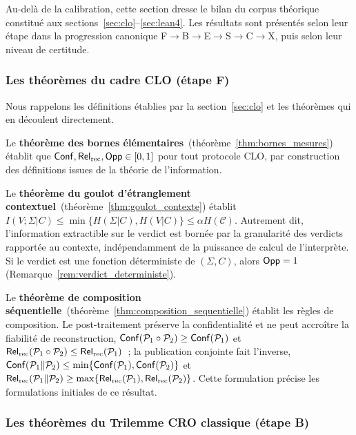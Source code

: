 \begin{sloppypar}
Au-del\`a de la calibration, cette section dresse le bilan du
corpus th\'eorique constitu\'e aux sections~\ref{sec:clo}--\ref{sec:lean4}.
Les r\'esultats sont pr\'esent\'es selon leur \'etape dans la progression
canonique F$\to$B$\to$E$\to$S$\to$C$\to$X,
puis selon leur niveau de certitude.

\subsubsection{Les th\'eor\`emes du cadre CLO (\'etape F)}
\label{subsubsec:resultats_etape_F}

Nous rappelons les d\'efinitions \'etablies par la
section~\ref{sec:clo} et les th\'eor\`emes qui en d\'ecoulent directement.

Le \textbf{th\'eor\`eme des bornes \'el\'ementaires}~(th\'eor\`eme~\ref{thm:bornes_mesures})
\'etablit que $\mathsf{Conf}, \mathsf{Rel}_{\mathrm{rec}}, \mathsf{Opp} \in [0,1]$ pour tout protocole CLO, par
construction des d\'efinitions issues de la th\'eorie de l'information.

Le \textbf{th\'eor\`eme du goulot d'\'etranglement contextuel}~(th\'eor\`eme~\ref{thm:goulot_contexte})
\'etablit $I(V;\Sigma|C) \leq \min\{H(\Sigma|C),H(V|C)\} \leq \alpha H(\mathcal{C})$. Autrement dit,
l'information extractible sur le verdict est born\'ee par la granularit\'e des
verdicts rapport\'ee au contexte, ind\'ependamment de la puissance de calcul
de l'interpr\`ete. Si le verdict est une fonction d\'eterministe de $(\Sigma,C)$,
alors $\mathsf{Opp} = 1$ (Remarque~\ref{rem:verdict_deterministe}).

Le \textbf{th\'eor\`eme de composition s\'equentielle}~(th\'eor\`eme~\ref{thm:composition_sequentielle})
\'etablit les r\`egles de composition. Le post-traitement pr\'eserve la
confidentialit\'e et ne peut accro\^itre la fiabilit\'e de reconstruction,
$\mathsf{Conf}(\mathcal{P}_1 \circ \mathcal{P}_2) \geq \mathsf{Conf}(\mathcal{P}_1)$ et
$\mathsf{Rel}_{\mathrm{rec}}(\mathcal{P}_1 \circ \mathcal{P}_2) \leq \mathsf{Rel}_{\mathrm{rec}}(\mathcal{P}_1)$~; la publication
conjointe fait l'inverse,
$\mathsf{Conf}(\mathcal{P}_1 \| \mathcal{P}_2) \leq \min\{\mathsf{Conf}(\mathcal{P}_1),\mathsf{Conf}(\mathcal{P}_2)\}$ et
$\mathsf{Rel}_{\mathrm{rec}}(\mathcal{P}_1 \| \mathcal{P}_2) \geq \max\{\mathsf{Rel}_{\mathrm{rec}}(\mathcal{P}_1),\mathsf{Rel}_{\mathrm{rec}}(\mathcal{P}_2)\}$.
Cette formulation pr\'ecise les formulations initiales de ce r\'esultat.

\subsubsection{Les th\'eor\`emes du Trilemme CRO classique (\'etape B)}
\label{subsubsec:resultats_etape_B}


\end{sloppypar}
